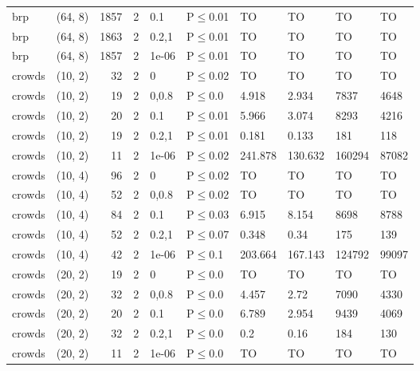 \begin{longtable}{llrrllllll}
 brp           & (64, 8)   &   	1857 &    2 & 0.1   & P$\leq$0.01  & TO       & TO       & TO      & TO     \\
 brp           & (64, 8)   &   	1863 &    2 & 0.2,1 & P$\leq$0.01  & TO       & TO       & TO      & TO     \\
 brp           & (64, 8)   &   	1857 &    2 & 1e-06 & P$\leq$0.01  & TO       & TO       & TO      & TO     \\
 crowds        & (10, 2)   &     	32 &    2 & 0     & P$\leq$0.02  & TO       & TO       & TO      & TO     \\
 crowds        & (10, 2)   &     	19 &    2 & 0,0.8 & P$\leq$0.0   & 4.918    & 2.934    & 7837    & 4648   \\
 crowds        & (10, 2)   &     	20 &    2 & 0.1   & P$\leq$0.01  & 5.966    & 3.074    & 8293    & 4216   \\
 crowds        & (10, 2)   &     	19 &    2 & 0.2,1 & P$\leq$0.01  & 0.181    & 0.133    & 181     & 118    \\
 crowds        & (10, 2)   &     	11 &    2 & 1e-06 & P$\leq$0.02  & 241.878  & 130.632  & 160294  & 87082  \\
 crowds        & (10, 4)   &     	96 &    2 & 0     & P$\leq$0.02  & TO       & TO       & TO      & TO     \\
 crowds        & (10, 4)   &     	52 &    2 & 0,0.8 & P$\leq$0.02  & TO       & TO       & TO      & TO     \\
 crowds        & (10, 4)   &     	84 &    2 & 0.1   & P$\leq$0.03  & 6.915    & 8.154    & 8698    & 8788   \\
 crowds        & (10, 4)   &     	52 &    2 & 0.2,1 & P$\leq$0.07  & 0.348    & 0.34     & 175     & 139    \\
 crowds        & (10, 4)   &     	42 &    2 & 1e-06 & P$\leq$0.1   & 203.664  & 167.143  & 124792  & 99097  \\
 crowds        & (20, 2)   &     	19 &    2 & 0     & P$\leq$0.0   & TO       & TO       & TO      & TO     \\
 crowds        & (20, 2)   &     	32 &    2 & 0,0.8 & P$\leq$0.0   & 4.457    & 2.72     & 7090    & 4330   \\
 crowds        & (20, 2)   &     	20 &    2 & 0.1   & P$\leq$0.0   & 6.789    & 2.954    & 9439    & 4069   \\
 crowds        & (20, 2)   &     	32 &    2 & 0.2,1 & P$\leq$0.0   & 0.2      & 0.16     & 184     & 130    \\
 crowds        & (20, 2)   &     	11 &    2 & 1e-06 & P$\leq$0.0   & TO       & TO       & TO      & TO     \\

\end{longtable}
